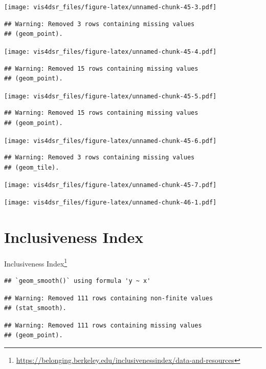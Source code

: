 \documentclass[
]{krantz}
\renewcommand{\href}[2]{#2\footnote{\url{#1}}}
\begin{document}
\texttt{[image: vis4dsr\_files/figure-latex/unnamed-chunk-45-3.pdf]}

\begin{verbatim}
## Warning: Removed 3 rows containing missing values
## (geom_point).
\end{verbatim}

\texttt{[image: vis4dsr\_files/figure-latex/unnamed-chunk-45-4.pdf]}

\begin{verbatim}
## Warning: Removed 15 rows containing missing values
## (geom_point).
\end{verbatim}

\texttt{[image: vis4dsr\_files/figure-latex/unnamed-chunk-45-5.pdf]}

\begin{verbatim}
## Warning: Removed 15 rows containing missing values
## (geom_point).
\end{verbatim}

\texttt{[image: vis4dsr\_files/figure-latex/unnamed-chunk-45-6.pdf]}

\begin{verbatim}
## Warning: Removed 3 rows containing missing values
## (geom_tile).
\end{verbatim}

\texttt{[image: vis4dsr\_files/figure-latex/unnamed-chunk-45-7.pdf]}

\texttt{[image: vis4dsr\_files/figure-latex/unnamed-chunk-46-1.pdf]}

\hypertarget{inclusiveness-index}{%
\section*{Inclusiveness Index}\label{inclusiveness-index}}


\href{https://belonging.berkeley.edu/inclusivenessindex/data-and-resources}{Inclusiveness Index}

\begin{verbatim}
## `geom_smooth()` using formula 'y ~ x'
\end{verbatim}

\begin{verbatim}
## Warning: Removed 111 rows containing non-finite values
## (stat_smooth).
\end{verbatim}

\begin{verbatim}
## Warning: Removed 111 rows containing missing values
## (geom_point).
\end{verbatim}
\end{document}
